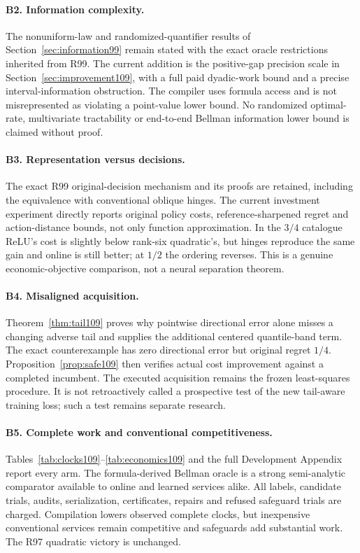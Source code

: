 \documentclass[11pt]{article}
\begin{document}
\paragraph{B2. Information complexity.}
The nonuniform-law and randomized-quantifier results of Section~\ref{sec:information99} remain stated with the exact oracle restrictions inherited from R99. The current addition is the positive-gap precision scale in Section~\ref{sec:improvement109}, with a full paid dyadic-work bound and a precise interval-information obstruction. The compiler uses formula access and is not misrepresented as violating a point-value lower bound. No randomized optimal-rate, multivariate tractability or end-to-end Bellman information lower bound is claimed without proof.

\paragraph{B3. Representation versus decisions.}
The exact R99 original-decision mechanism and its proofs are retained, including the equivalence with conventional oblique hinges. The current investment experiment directly reports original policy costs, reference-sharpened regret and action-distance bounds, not only function approximation. In the $3/4$ catalogue ReLU's cost is slightly below rank-six quadratic's, but hinges reproduce the same gain and online is still better; at $1/2$ the ordering reverses. This is a genuine economic-objective comparison, not a neural separation theorem.

\paragraph{B4. Misaligned acquisition.}
Theorem~\ref{thm:tail109} proves why pointwise directional error alone misses a changing adverse tail and supplies the additional centered quantile-band term. The exact counterexample has zero directional error but original regret $1/4$. Proposition~\ref{prop:safe109} then verifies actual cost improvement against a completed incumbent. The executed acquisition remains the frozen least-squares procedure. It is not retroactively called a prospective test of the new tail-aware training loss; such a test remains separate research.

\paragraph{B5. Complete work and conventional competitiveness.}
Tables~\ref{tab:clocks109}--\ref{tab:economics109} and the full Development Appendix report every arm. The formula-derived Bellman oracle is a strong semi-analytic comparator available to online and learned services alike. All labels, candidate trials, audits, serialization, certificates, repairs and refused safeguard trials are charged. Compilation lowers observed complete clocks, but inexpensive conventional services remain competitive and safeguards add substantial work. The R97 quadratic victory is unchanged.
\end{document}
